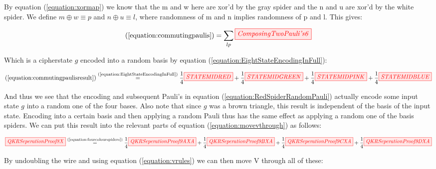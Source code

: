 \documentclass[]{article}
\newcommand{\equaltext}[1]{\ensuremath{\stackrel{\text{#1}}{=}}}
\begin{document}
By equation (\ref{equation:xormap}) we know that the m and w here are xor'd by the gray spider and the n and u are xor'd by the white spider. We define $m \oplus w \equiv p$ and $n \oplus u \equiv l$, where randomness of m and n implies randomness of p and l. This gives:

\begin{equation}
	\label{equation:commutingpaulisresult}
	(\ref{equation:commutingpaulis}) = \sum\limits_{lp} \tikzfig{ComposingTwoPauli's6}
\end{equation}

Which is a cipherstate $g$ encoded into a random basis by equation (\ref{equation:EightStateEncodingInFull}):

\begin{equation}
	\label{equation:fourcolourspiders}
	(\ref{equation:commutingpaulisresult}) \equaltext{(\ref{equation:EightStateEncodingInFull})}
	 \frac{1}{4}\tikzfig{STATEMIDRED} +
	 \frac{1}{4}\tikzfig{STATEMIDGREEN} +
	 \frac{1}{4}\tikzfig{STATEMIDPINK}+
	 \frac{1}{4}\tikzfig{STATEMIDBLUE}	
\end{equation}

And thus we see that the encoding and subsequent Pauli's in equation (\ref{equation:RedSpiderRandomPauli}) actually encode some input state $g$ into a random one of the four bases. Also note that since $g$ was a brown triangle, this result is independent of the basis of the input state. Encoding into a certain basis and then applying a random Pauli thus has the same effect as applying a random one of the basis spiders. We can put this result into the relevant parts of equation (\ref{equation:movevthrough}) as follows:

\begin{equation}
	\label{equation:QKRSeperationProof}
	\tikzfig{QKRSeperationProof8X} \equaltext{(\ref{equation:fourcolourspiders})} \frac{1}{4}\tikzfig{QKRSeperationProof9AXA} + \frac{1}{4} \tikzfig{QKRSeperationProof9BXA} + \frac{1}{4} \tikzfig{QKRSeperationProof9CXA} + \frac{1}{4} \tikzfig{QKRSeperationProof9DXA}
\end{equation}

By undoubling the wire and using equation (\ref{equation:vrules}) we can then move V through all of these:
\end{document}
